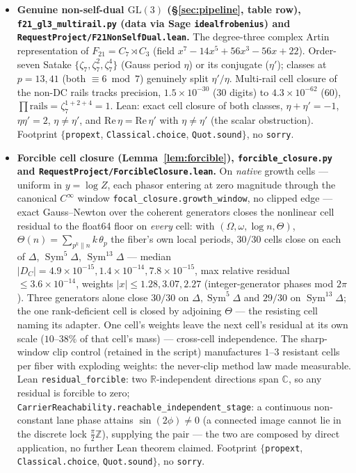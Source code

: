 \documentclass[11pt]{article}
\theoremstyle{definition}
\newcommand{\Sym}{\operatorname{Sym}}
\begin{document}
\begin{itemize}
\item \textbf{Genuine non-self-dual $\mathrm{GL}(3)$ (\S\ref{sec:pipeline}, table row), \texttt{f21\_gl3\_multirail.py} (data via Sage \texttt{idealfrobenius}) and \texttt{RequestProject/F21NonSelfDual.lean}.} The degree-three complex Artin representation of $F_{21}=C_7\rtimes C_3$ (field $x^7-14x^5+56x^3-56x+22$). Order-seven Satake $\{\zeta_7,\zeta_7^2,\zeta_7^4\}$ (Gauss period $\eta$) or its conjugate ($\eta'$); classes at $p=13,41$ (both $\equiv6\bmod7$) genuinely split $\eta'/\eta$. Multi-rail cell closure of the non-DC rails tracks precision, $1.5\times10^{-30}$ (30 digits) to $4.3\times10^{-62}$ (60), $\prod\text{rails}=\zeta_7^{1+2+4}=1$. Lean: exact cell closure of both classes, $\eta+\eta'=-1$, $\eta\eta'=2$, $\eta\ne\eta'$, and $\mathrm{Re}\,\eta=\mathrm{Re}\,\eta'$ with $\eta\ne\eta'$ (the scalar obstruction). Footprint $\{$\texttt{propext}, \texttt{Classical.choice}, \texttt{Quot.sound}$\}$, no \texttt{sorry}.

\item \textbf{Forcible cell closure (Lemma~\ref{lem:forcible}), \texttt{forcible\_closure.py} and \texttt{RequestProject/ForcibleClosure.lean}.} On \emph{native} growth cells --- uniform in $y=\log Z$, each phasor entering at zero magnitude through the canonical $C^{\infty}$ window \texttt{focal\_closure.growth\_window}, no clipped edge --- exact Gauss--Newton over the coherent generators closes the nonlinear cell residual to the float64 floor on \emph{every} cell: with $(\Omega,\omega,\log n,\Theta)$, $\Theta(n)=\sum_{p^k\|n}k\,\theta_p$ the fiber's own local periods, $30/30$ cells close on each of $\Delta$, $\Sym^5\Delta$, $\Sym^{13}\Delta$ --- median $|D_C|=4.9\times10^{-15},1.4\times10^{-14},7.8\times10^{-15}$, max relative residual $\le3.6\times10^{-14}$, weights $|x|\le1.28,3.07,2.27$ (integer-generator phases mod $2\pi$). Three generators alone close $30/30$ on $\Delta,\Sym^5\Delta$ and $29/30$ on $\Sym^{13}\Delta$; the one rank-deficient cell is closed by adjoining $\Theta$ --- the resisting cell naming its adapter. One cell's weights leave the next cell's residual at its own scale ($10$--$38\%$ of that cell's mass) --- cross-cell independence. The sharp-window clip control (retained in the script) manufactures $1$--$3$ resistant cells per fiber with exploding weights: the never-clip method law made measurable. Lean \texttt{residual\_forcible}: two $\mathbb R$-independent directions span $\mathbb C$, so any residual is forcible to zero; \texttt{CarrierReachability.reachable\_independent\_stage}: a continuous non-constant lane phase attains $\sin(2\phi)\neq0$ (a connected image cannot lie in the discrete lock $\tfrac{\pi}{2}\mathbb Z$), supplying the pair --- the two are composed by direct application, no further Lean theorem claimed. Footprint $\{$\texttt{propext}, \texttt{Classical.choice}, \texttt{Quot.sound}$\}$, no \texttt{sorry}.


\end{itemize}
\end{document}
